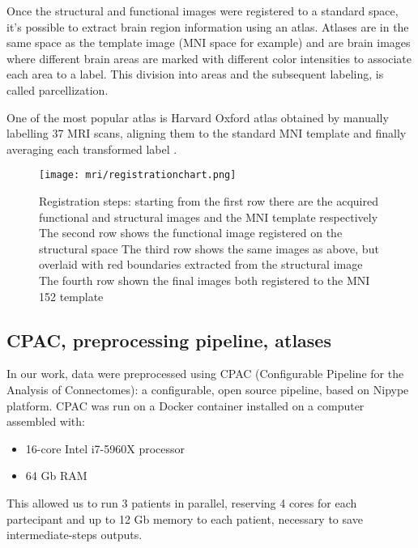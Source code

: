 \documentclass[a4paper,11pt]{article}
\begin{document}
Once the structural and functional images were registered to a standard space, it's possible to extract brain region information using an atlas.
Atlases are in the same space as the template image (MNI space for example) and are brain images where different brain areas are marked with different color intensities to associate each area to a label.
This division into areas and the subsequent labeling, is called parcellization.

One of the most popular atlas is Harvard Oxford atlas obtained by manually labelling 37 MRI scans, aligning them to the standard MNI template and finally averaging each transformed label \cite{chappell-neuroimaging}.


\begin{figure}
\centering
\texttt{[image: mri/registrationchart.png]}
\caption{Registration steps:
 starting from the first row there are the acquired functional and structural images and the MNI template respectively
 The second row shows the functional image registered on the structural space
 The third row shows the same images as above, but overlaid with red boundaries extracted from the structural image
 The fourth row shown the final images both registered to the MNI 152 template
}
\label{fig:registrationchart}
\end{figure}



\subsection{CPAC, preprocessing pipeline, atlases}
In our work, data were preprocessed using CPAC (Configurable Pipeline for the Analysis of Connectomes): a configurable, open source pipeline, based on Nipype platform.
CPAC was run on a Docker container installed on a computer assembled with:
\begin{itemize}
\item 16-core Intel i7-5960X processor
\item 64 Gb RAM
\end{itemize}
This allowed us to run 3 patients in parallel, reserving 4 cores for each partecipant and up to 12 Gb memory to each patient, necessary to save intermediate-steps outputs.
\end{document}
